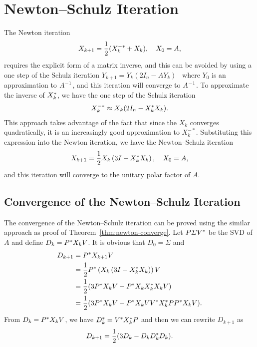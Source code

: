 \documentclass[12pt]{article}
\begin{document}
\section{Newton--Schulz Iteration}

The Newton iteration 
\begin{equation}
    \notag
    X_{k+1} = \frac 12(X_k^{-*} + X_k),\quad X_0 = A,
\end{equation}
requires the explicit form of a matrix inverse, and this can be avoided by using a one step of the Schulz iteration $Y_{k+1} = Y_k(2I_n - AY_k)$~ where $Y_0$ is an approximation to $A^{-1}$, and this iteration will converge to $A^{-1}$. To approximate the inverse of $X_k^*$, we have the one step of the Schulz iteration 
\begin{equation}
    \notag 
    X_k^{-*} \approx X_k(2I_n - X_k^* X_k).
\end{equation}
This approach takes advantage of the fact that since the $X_k$ converges quadratically, it is an increasingly good approximation to $X_k^{-*}$.
Substituting this expression into the Newton iteration, we have the Newton--Schulz iteration~ 
\begin{equation}
    \label{eq:ns-iteration}
    X_{k+1} = \frac 12 X_k\left(3I - X_k^* X_k\right), \quad X_0 = A,
\end{equation}
and this iteration will converge to the unitary polar factor of $A$.

\subsection{Convergence of the Newton--Schulz Iteration}
The convergence of the Newton--Schulz iteration can be proved 
using the similar approach as proof of Theorem~\ref{thm:newton-converge}. Let $P\varSigma V^*$ be the SVD of $A$ and define $D_k = P^* X_k V$. It is obvious that $D_0 = \Sigma$ and 
\begin{equation}
    \notag 
    \begin{aligned}
        D_{k+1} &= P^* X_{k+1} V\\
        & = \frac{1}{2}P^* \left(X_k\left(3I - X_k^* X_k\right)\right)V\\
        & = \frac{1}{2} (3P^* X_k V - P^* X_kX_k^* X_k V)\\
        & = \frac{1}{2} (3P^* X_k V - P^* X_k V V^* X_k^* P P^* X_k V).
    \end{aligned}
\end{equation}
From $D_k = P^* X_k V$, we have $D_k^* = V^* X_k^* P$ and then we can rewrite $D_{k+1}$ as
\begin{equation}
    \label{eq:ns-iter1}
    D_{k+1} = \frac{1}{2}(3D_k-D_kD_k^* D_k).
\end{equation}
\end{document}
